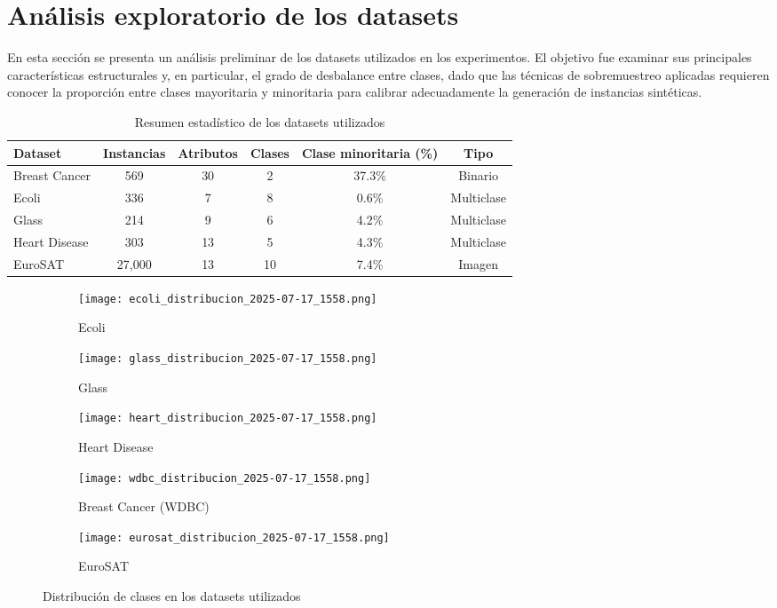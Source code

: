 \section{Análisis exploratorio de los datasets}

En esta sección se presenta un análisis preliminar de los datasets utilizados en los experimentos. El objetivo fue examinar sus principales características estructurales y, en particular, el grado de desbalance entre clases, dado que las técnicas de sobremuestreo aplicadas requieren conocer la proporción entre clases mayoritaria y minoritaria para calibrar adecuadamente la generación de instancias sintéticas.

\begin{table}[H]
\centering
\caption{Resumen estadístico de los datasets utilizados}
\begin{tabularx}{\textwidth}{lccccc}
\toprule
\textbf{Dataset} & \textbf{Instancias} & \textbf{Atributos} & \textbf{Clases} & \textbf{Clase minoritaria (\%)} & \textbf{Tipo} \\
\midrule
Breast Cancer & 569 & 30 & 2 & 37.3\% & Binario \\
Ecoli & 336 & 7 & 8 & 0.6\% & Multiclase \\
Glass & 214 & 9 & 6 & 4.2\% & Multiclase \\
Heart Disease & 303 & 13 & 5 & 4.3\% & Multiclase \\
EuroSAT & 27,000 & 13 & 10 & 7.4\% & Imagen \\
\bottomrule
\end{tabularx}
\label{tab:resumen_datasets}
\end{table}

\begin{figure}[H]
\centering

\begin{subfigure}[t]{0.45\textwidth}
  \texttt{[image: ecoli\_distribucion\_2025-07-17\_1558.png]}
  \caption{Ecoli}
\end{subfigure}
\hfill
\begin{subfigure}[t]{0.45\textwidth}
  \texttt{[image: glass\_distribucion\_2025-07-17\_1558.png]}
  \caption{Glass}
\end{subfigure}
\hfill
\begin{subfigure}[t]{0.45\textwidth}
  \texttt{[image: heart\_distribucion\_2025-07-17\_1558.png]}
  \caption{Heart Disease}
\end{subfigure}

\vspace{0.5cm}

\begin{subfigure}[t]{0.45\textwidth}
  \texttt{[image: wdbc\_distribucion\_2025-07-17\_1558.png]}
  \caption{Breast Cancer (WDBC)}
\end{subfigure}
\hfill
\begin{subfigure}[t]{0.45\textwidth}
  \texttt{[image: eurosat\_distribucion\_2025-07-17\_1558.png]}
  \caption{EuroSAT}
\end{subfigure}

\caption{Distribución de clases en los datasets utilizados}
\label{fig:distribucion_datasets}
\end{figure}


